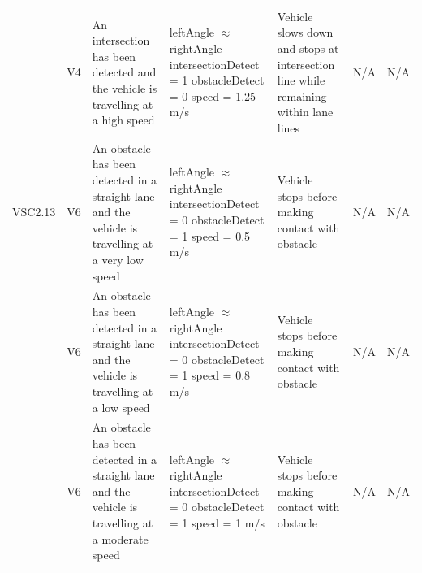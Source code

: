 \documentclass [10pt]{article}
\begin{document}
\begin{longtable}{ | p{ } | p{ } |  p{ } |  p{ } | p{ } | p{ } |  p{ } |}
    \rowcolor{tableCell}\multicolumn{1}{|c|}{VSC2.12} 
    & \multicolumn{1}{c|}{V4}
    & An intersection has been detected and the vehicle is travelling at a high speed
    & leftAngle $\approx$ rightAngle \newline
    intersectionDetect = 1 \newline
    obstacleDetect = 0 \newline
    speed = 1.25 m/s
    & Vehicle slows down and stops at intersection line while remaining within lane lines
    & N/A
    & \multicolumn{1}{c|}{N/A}\\
    
    \multicolumn{1}{|c|}{VSC2.13} 
    & \multicolumn{1}{c|}{V6}
    & An obstacle has been detected in a straight lane and the vehicle is travelling at a very low speed
    & leftAngle $\approx$ rightAngle \newline
    intersectionDetect = 0 \newline
    obstacleDetect = 1 \newline
    speed = 0.5 m/s
    & Vehicle stops before making contact with obstacle
    & N/A
    & \multicolumn{1}{c|}{N/A}\\ 
    
    \rowcolor{tableCell}\multicolumn{1}{|c|}{VSC2.14} 
    & \multicolumn{1}{c|}{V6}
    & An obstacle has been detected in a straight lane and the vehicle is travelling at a low speed
    & leftAngle $\approx$ rightAngle \newline
    intersectionDetect = 0 \newline
    obstacleDetect = 1 \newline
    speed = 0.8 m/s
    & Vehicle stops before making contact with obstacle
    & N/A
    & \multicolumn{1}{c|}{N/A}\\  \hline
    
    \newpage \hline
    
    \multicolumn{1}{|c|}{VSC2.15} 
    & \multicolumn{1}{c|}{V6}
    & An obstacle has been detected in a straight lane and the vehicle is travelling at a moderate speed
    & leftAngle $\approx$ rightAngle \newline
    intersectionDetect = 0 \newline
    obstacleDetect = 1 \newline
    speed = 1 m/s
    & Vehicle stops before making contact with obstacle
    & N/A
    & \multicolumn{1}{c|}{N/A}\\
    

\end{longtable}
\end{document}
